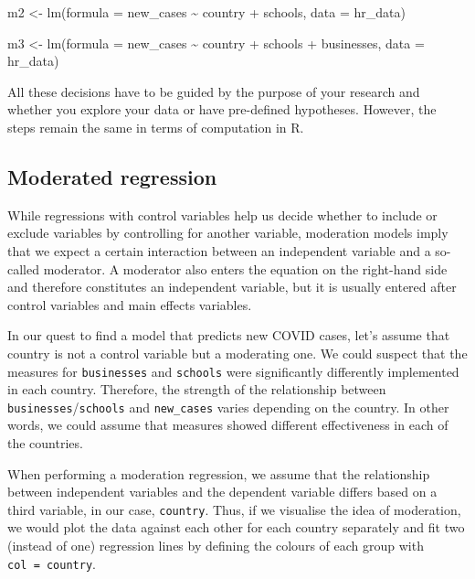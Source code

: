 \documentclass[
]{book}
\begin{document}
m2 \textless- lm(formula = new\_cases \textasciitilde{} country + schools, data = hr\_data)

m3 \textless- lm(formula = new\_cases \textasciitilde{} country + schools + businesses, data = hr\_data)

All these decisions have to be guided by the purpose of your research and whether you explore your data or have pre-defined hypotheses. However, the steps remain the same in terms of computation in R.

\hypertarget{moderated-regression}{%
\subsection{Moderated regression}\label{moderated-regression}}

While regressions with control variables help us decide whether to include or exclude variables by controlling for another variable, moderation models imply that we expect a certain interaction between an independent variable and a so-called moderator. A moderator also enters the equation on the right-hand side and therefore constitutes an independent variable, but it is usually entered after control variables and main effects variables.

In our quest to find a model that predicts new COVID cases, let's assume that country is not a control variable but a moderating one. We could suspect that the measures for \texttt{businesses} and \texttt{schools} were significantly differently implemented in each country. Therefore, the strength of the relationship between \texttt{businesses}/\texttt{schools} and \texttt{new\_cases} varies depending on the country. In other words, we could assume that measures showed different effectiveness in each of the countries.

When performing a moderation regression, we assume that the relationship between independent variables and the dependent variable differs based on a third variable, in our case, \texttt{country}. Thus, if we visualise the idea of moderation, we would plot the data against each other for each country separately and fit two (instead of one) regression lines by defining the colours of each group with \texttt{col\ =\ country}.
\end{document}
